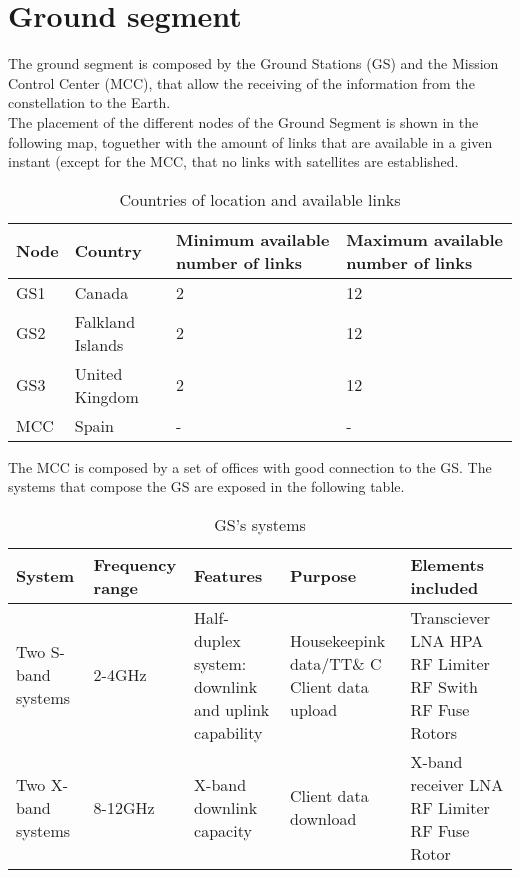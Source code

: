 \chapter{Ground segment}
The ground segment is composed by the Ground Stations (GS) and the Mission Control Center (MCC), that allow the receiving of the information from the constellation to the Earth.\\
The placement of the different nodes of the Ground Segment is shown in the following map, toguether with the amount of links that are available in a given instant (except for the MCC, that no links with satellites are established.  
\begin{table}[H]
\begin{center}
\begin{tabular}{|l|l|p{3.5cm}|p{3.5cm}|}
\hline
\rowcolor[gray]{0.80} \textbf{Node}&\textbf{Country}&\textbf{Minimum available number of links}&\textbf{Maximum available number of links}\\
\hline
GS1&Canada&2&12\\
\hline
GS2&Falkland Islands&2&12\\
\hline
GS3&United Kingdom&2&12\\
\hline
MCC&Spain&-&-\\
\hline
\end{tabular}
\caption{Countries of location and available links}
\end{center}
\end{table}
The MCC is composed by a set of offices with good connection to the GS. The systems that compose the GS are exposed in the following table. 
\begin{table}[H]
\begin{center}
\begin{tabular}{|p{1.5cm}|p{2cm}|p{3cm}|p{3cm}|p{3cm}|}
\hline
\rowcolor[gray]{0.80} \textbf{System}&\textbf{Frequency range}&\textbf{Features}&\textbf{Purpose}&\textbf{Elements included}\\
\hline
Two S-band systems&2-4GHz&Half-duplex system: downlink and uplink capability&Housekeepink data/TT\& C \newline
Client data upload&
Transciever 
\newline
LNA
\newline
HPA
\newline
RF Limiter
\newline
RF Swith
\newline
RF Fuse
\newline
Rotors\\
\hline
Two X-band systems&8-12GHz&X-band downlink capacity&Client data download&X-band receiver
\newline
LNA
\newline
RF Limiter
\newline
RF Fuse
\newline
Rotor\\
\hline
\end{tabular}
\caption{GS's systems}
\end{center}
\end{table}